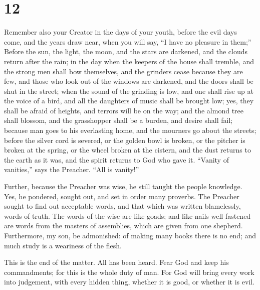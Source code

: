 \hypertarget{section-11}{%
\section{12}\label{section-11}}

 Remember also your Creator in the days of your youth,
before the evil days come, and the years draw near, when you will say,
``I have no pleasure in them;''  Before the sun, the
light, the moon, and the stars are darkened, and the clouds return after
the rain;  in the day when the keepers of the house shall
tremble, and the strong men shall bow themselves, and the grinders cease
because they are few, and those who look out of the windows are
darkened,  and the doors shall be shut in the street; when
the sound of the grinding is low, and one shall rise up at the voice of
a bird, and all the daughters of music shall be brought low;
 yes, they shall be afraid of heights, and terrors will be
on the way; and the almond tree shall blossom, and the grasshopper shall
be a burden, and desire shall fail; because man goes to his everlasting
home, and the mourners go about the streets;  before the
silver cord is severed, or the golden bowl is broken, or the pitcher is
broken at the spring, or the wheel broken at the cistern, 
and the dust returns to the earth as it was, and the spirit returns to
God who gave it.  ``Vanity of vanities,'' says the
Preacher. ``All is vanity!''

 Further, because the Preacher was wise, he still taught
the people knowledge. Yes, he pondered, sought out, and set in order
many proverbs.  The Preacher sought to find out
acceptable words, and that which was written blamelessly, words of
truth.  The words of the wise are like goads; and like
nails well fastened are words from the masters of assemblies, which are
given from one shepherd.  Furthermore, my son, be
admonished: of making many books there is no end; and much study is a
weariness of the flesh.

 This is the end of the matter. All has been heard. Fear
God and keep his commandments; for this is the whole duty of man.
 For God will bring every work into judgement, with every
hidden thing, whether it is good, or whether it is evil.
